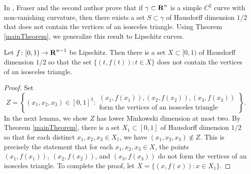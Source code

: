 In \cite{MalabikaRob}, Fraser and the second author prove that if $\gamma\subset\operatorname{\mathbf{R}}^n$ is a simple $C^2$ curve with non-vanishing curvature, then there exists a set $S\subset\gamma$ of Hausdorff dimension $1/2$ that does not contain the vertices of an isosceles triangle. Using Theorem \ref{mainTheorem}, we generalize this result to Lipschitz curves. 

\begin{theorem}\label{C1IsoscelesThm}
	Let $f\colon [0,1) \to \operatorname{\mathbf{R}}^{n-1}$ be Lipschitz. Then there is a set $X \subset [0,1)$ of Hausdorff dimension $1/2$ so that the set $\{(t,f(t)) : t\in X\}$ does not contain the vertices of an isosceles triangle.
\end{theorem}
\begin{proof}
	Set
	\[ Z = \left\{ (x_1,x_2,x_3) \in [0,1]^3: \begin{array}{c} (x_1,f(x_1)), (x_2,f(x_2)), (x_3,f(x_3))\\
		\textrm{form the vertices of an isosceles triangle} \end{array} \right\}. \]
	In the next lemma, we show $Z$ has lower Minkowski dimension at most two. By Theorem \ref{mainTheorem}, there is a set $X_1\subset[0,1]$ of Hausdorff dimension $1/2$ so that for each distinct $x_1,x_2,x_3\in X_1$, we have $(x_1,x_2,x_3)\not\in Z$. This is precisely the statement that for each $x_1,x_2,x_3\in X$, the points $(x_1,f(x_1)),\ (x_2,f(x_2))$, and $(x_3,f(x_3))$ do not form the vertices of an isosceles triangle. To complete the proof, let $X = \{ (x,f(x)) : x \in X_1 \}$.
\end{proof}

